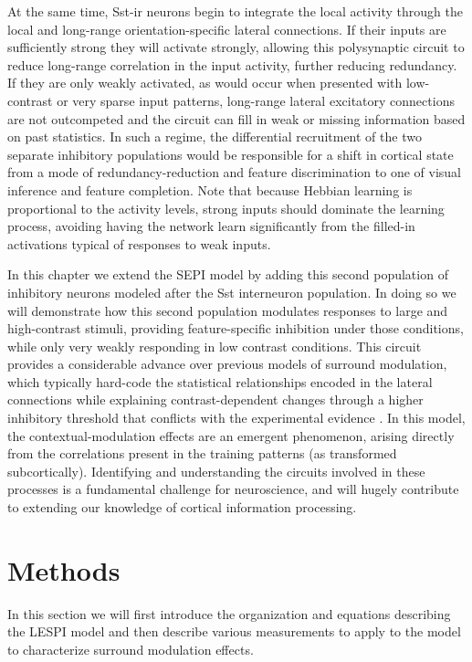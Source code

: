 At the same time, Sst-ir neurons begin to integrate the local activity
through the local and long-range orientation-specific lateral
connections. If their inputs are sufficiently strong they will
activate strongly, allowing this polysynaptic circuit to reduce
long-range correlation in the input activity, further reducing
redundancy. If they are only weakly activated, as would occur when
presented with low-contrast or very sparse input patterns, long-range
lateral excitatory connections are not outcompeted and the circuit can
fill in weak or missing information based on past statistics. In such
a regime, the differential recruitment of the two separate inhibitory
populations would be responsible for a shift in cortical state from a
mode of redundancy-reduction and feature discrimination to one of
visual inference and feature completion.  Note that because Hebbian
learning is proportional to the activity levels, strong inputs should
dominate the learning process, avoiding having the network learn
significantly from the filled-in activations typical of responses to
weak inputs.

In this chapter we extend the SEPI model by adding this second
population of inhibitory neurons modeled after the Sst interneuron
population. In doing so we will demonstrate how this second population
modulates responses to large and high-contrast stimuli, providing
feature-specific inhibition under those conditions, while only very
weakly responding in low contrast conditions. This circuit provides a
considerable advance over previous models of surround modulation,
which typically hard-code the statistical relationships encoded in the
lateral connections while explaining contrast-dependent changes
through a higher inhibitory threshold that conflicts with the
experimental evidence \citep{Li2002, Schwabe2006}. In this model, the
contextual-modulation effects are an emergent phenomenon, arising
directly from the correlations present in the training patterns (as
transformed subcortically).  Identifying and understanding the
circuits involved in these processes is a fundamental challenge for
neuroscience, and will hugely contribute to extending our knowledge of
cortical information processing.

\section{Methods}

In this section we will first introduce the organization and equations
describing the LESPI model and then describe various measurements to
apply to the model to characterize surround modulation effects.


